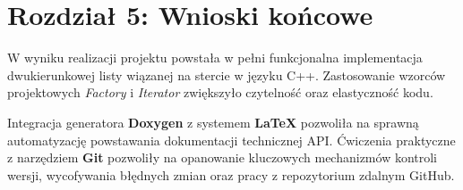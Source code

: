 \section{Rozdział 5: Wnioski końcowe}

W wyniku realizacji projektu powstała w pełni funkcjonalna implementacja dwukierunkowej listy wiązanej na stercie w języku C++. Zastosowanie wzorców projektowych \textit{Factory} i \textit{Iterator} zwiększyło czytelność oraz elastyczność kodu.

Integracja generatora \textbf{Doxygen} z systemem \textbf{\LaTeX{}} pozwoliła na sprawną automatyzację powstawania dokumentacji technicznej API. Ćwiczenia praktyczne z narzędziem \textbf{Git} pozwoliły na opanowanie kluczowych mechanizmów kontroli wersji, wycofywania błędnych zmian oraz pracy z repozytorium zdalnym GitHub.